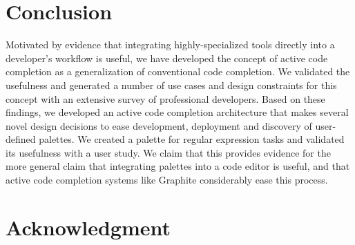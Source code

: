 \documentclass[10pt, conference, compsocconf]{IEEEtran}
\begin{document}
\section{Conclusion}
Motivated by evidence that integrating highly-specialized tools directly into a developer's workflow is useful, we have developed the concept of active code completion as a generalization of conventional code completion. We validated the usefulness and generated a number of use cases and design constraints for this concept with an extensive survey of professional developers. Based on these findings, we developed an active code completion architecture that makes several novel design decisions to ease development, deployment and discovery of user-defined palettes. We created a palette for regular expression tasks and validated its usefulness with a user study. We claim that this provides evidence for the more general claim that integrating palettes into a code editor is useful, and that active code completion systems like Graphite considerably ease this process.



\section*{Acknowledgment}




%
%
%

%




\end{document}
